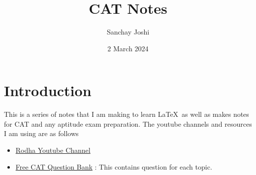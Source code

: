 \documentclass{book}
\title{CAT Notes}
\author{Sanchay Joshi}
\date{2 March 2024}
\begin{document}
\maketitle
\tableofcontents
\newpage



\chapter*{Introduction}
This is a series of notes that I am making to learn \LaTeX \, as well as makes notes for CAT and any aptitude exam preparation. The youtube channels and resources I am using are as follows

\begin{itemize}
    \item \href{https://www.youtube.com/@Rodha/playlists}{Rodha Youtube Channel}
    \item \href{https://iim-cat-questions-answers.2iim.com/}{Free CAT Question Bank} : This contains question for each topic. 
\end{itemize}



% 

% 

% 

% 
\end{document}
